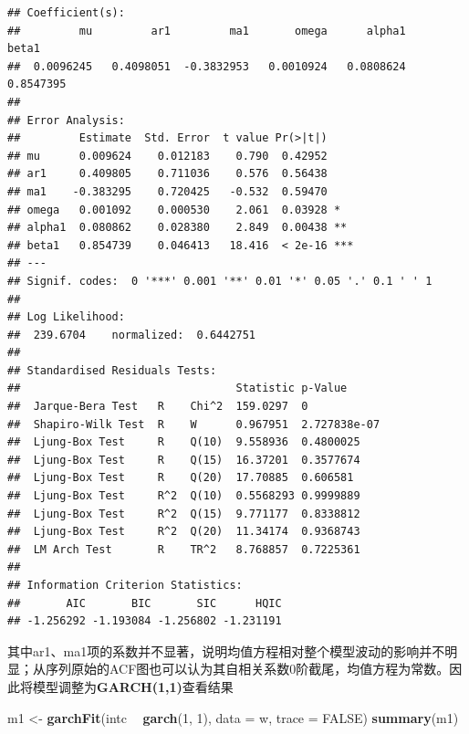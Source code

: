 \documentclass[
]{article}
\newenvironment{Shaded}{\begin{snugshade}}{\end{snugshade}}
\newcommand{\DataTypeTok}[1]{\textcolor[rgb]{0.13,0.29,0.53}{#1}}
\newcommand{\DecValTok}[1]{\textcolor[rgb]{0.00,0.00,0.81}{#1}}
\newcommand{\KeywordTok}[1]{\textcolor[rgb]{0.13,0.29,0.53}{\textbf{#1}}}
\newcommand{\NormalTok}[1]{#1}
\newcommand{\OperatorTok}[1]{\textcolor[rgb]{0.81,0.36,0.00}{\textbf{#1}}}
\newcommand{\OtherTok}[1]{\textcolor[rgb]{0.56,0.35,0.01}{#1}}
\newcommand{\StringTok}[1]{\textcolor[rgb]{0.31,0.60,0.02}{#1}}
\begin{document}
\begin{verbatim}
## Coefficient(s):
##         mu         ar1         ma1       omega      alpha1       beta1  
##  0.0096245   0.4098051  -0.3832953   0.0010924   0.0808624   0.8547395  
##
## Error Analysis:
##         Estimate  Std. Error  t value Pr(>|t|)    
## mu      0.009624    0.012183    0.790  0.42952    
## ar1     0.409805    0.711036    0.576  0.56438    
## ma1    -0.383295    0.720425   -0.532  0.59470    
## omega   0.001092    0.000530    2.061  0.03928 *  
## alpha1  0.080862    0.028380    2.849  0.00438 ** 
## beta1   0.854739    0.046413   18.416  < 2e-16 ***
## ---
## Signif. codes:  0 '***' 0.001 '**' 0.01 '*' 0.05 '.' 0.1 ' ' 1
## 
## Log Likelihood:
##  239.6704    normalized:  0.6442751 
## 
## Standardised Residuals Tests:
##                                 Statistic p-Value     
##  Jarque-Bera Test   R    Chi^2  159.0297  0           
##  Shapiro-Wilk Test  R    W      0.967951  2.727838e-07
##  Ljung-Box Test     R    Q(10)  9.558936  0.4800025   
##  Ljung-Box Test     R    Q(15)  16.37201  0.3577674   
##  Ljung-Box Test     R    Q(20)  17.70885  0.606581    
##  Ljung-Box Test     R^2  Q(10)  0.5568293 0.9999889   
##  Ljung-Box Test     R^2  Q(15)  9.771177  0.8338812   
##  Ljung-Box Test     R^2  Q(20)  11.34174  0.9368743   
##  LM Arch Test       R    TR^2   8.768857  0.7225361   
## 
## Information Criterion Statistics:
##       AIC       BIC       SIC      HQIC 
## -1.256292 -1.193084 -1.256802 -1.231191
\end{verbatim}

其中ar1、ma1项的系数并不显著，说明均值方程相对整个模型波动的影响并不明显；从序列原始的ACF图也可以认为其自相关系数0阶截尾，均值方程为常数。因此将模型调整为\textbf{GARCH(1,1)}查看结果

\begin{Shaded}
\begin{Highlighting}[]
\NormalTok{m1 <-}\StringTok{ }\KeywordTok{garchFit}\NormalTok{(intc }\OperatorTok{~}\StringTok{ }\KeywordTok{garch}\NormalTok{(}\DecValTok{1}\NormalTok{, }\DecValTok{1}\NormalTok{), }\DataTypeTok{data =}\NormalTok{ w, }\DataTypeTok{trace =} \OtherTok{FALSE}\NormalTok{)}
\KeywordTok{summary}\NormalTok{(m1)}
\end{Highlighting}
\end{Shaded}
\end{document}
